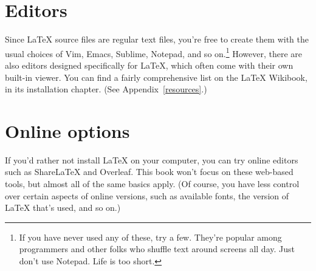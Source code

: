 \section{Editors}

Since \LaTeX{} source files are regular text files,
you're free to create them with the usual choices of Vim, Emacs,
Sublime, Notepad\plusplus, and so on.\punckern\footnote{If you have never used
any of these, try a few.
They're popular among programmers and other folks who shuffle text around
screens all day. Just don't use Notepad. Life is too short.}
However, there are also editors designed specifically for \LaTeX{},
which often come with their own built-in  viewer.
You can find a fairly comprehensive list on the \LaTeX{} Wikibook,
in its installation chapter. (See Appendix~\ref{resources}.)

\section{Online options}

If you'd rather not install \LaTeX{} on your computer,
you can try online editors such as Share\LaTeX{} and Overleaf.
This book won't focus on these web-based tools,
but almost all of the same basics apply.
(Of course, you have less control over certain aspects of online versions,
such as available fonts, the version of \LaTeX{} that's used, and so on.)
